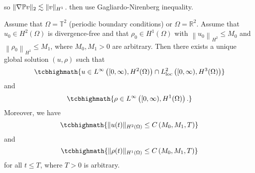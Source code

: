 so $\lVert\nabla\mathbb{P}v\rVert_{2}\lesssim\lVert v\rVert_{H^{1}}$. then use
Gagliardo-Nirenberg inequality.

\begin{theorem}{\cite{HKZ}}{}
	Assume that \colorbox{red!20}{$\Omega=\mathbb{T}^{2}$} (periodic boundary conditions) or 
	\colorbox{red!20}{$\Omega=\mathbb{R}^{2}$}. 
	Assume that \colorbox{red!20}{$u_{0} \in H^{2}(\Omega)$} is divergence-free and that 
	\colorbox{red!20}{$\rho_{0} \in H^{1}(\Omega)$} with 
	\colorbox{red!20}{$\left\|u_{0}\right\|_{H^{2}} \leq M_{0}$} and 
	\colorbox{red!20}{$\left\|\rho_{0}\right\|_{H^{1}} \leq M_{1}$}, 
	where $M_{0}, M_{1}>0$ are arbitrary. 
	Then there exists a unique global solution $(u, \rho)$ such that 
	$$\tcbhighmath{u \in L^{\infty}\left([0, \infty), H^{2}(\Omega)\right) \cap L_{\mathrm{loc}}^{2}\left([0, \infty), H^{3}(\Omega)\right)}$$ 
	and 
	$$\tcbhighmath{\rho \in L^{\infty}\left([0, \infty), H^{1}(\Omega)\right).}$$
	Moreover, we have
	$$
	\tcbhighmath{\|u(t)\|_{H^{2}(\Omega)} \leq C\left(M_{0}, M_{1}, T\right)}
	$$
	and
	$$
	\tcbhighmath{\|\rho(t)\|_{H^{1}(\Omega)} \leq C\left(M_{0}, M_{1}, T\right)}
	$$
	for all $t \leq T$, where $T>0$ is arbitrary.
\end{theorem}

